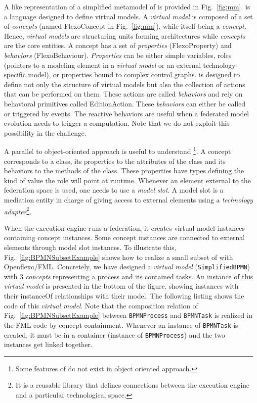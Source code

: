 A \UML like representation of a simplified metamodel of \FML is provided in
Fig.~\ref{fig:mm}. \FML is a language designed to define virtual models. A
\emph{virtual model} is composed of a set of \emph{concepts} (named
\textsf{FlexoConcept} in Fig.~\ref{fig:mm}), while itself being a
\emph{concept}. Hence, \emph{virtual models} are structuring units forming
architectures while \emph{concepts} are the core entities. A concept has a set
of \emph{properties} (\textsf{FlexoProperty}) and \emph{behaviors}
(\textsf{FlexoBehaviour}). \emph{Properties} can be either simple variables,
roles (pointers to a modeling element in a \emph{virtual model} or an external
technology-specific model), or properties bound to complex control graphs. \FML
is designed to define not only the structure of virtual models but also the
collection of actions that can be performed on them. These actions are called
\emph{behaviors} and rely on behavioral primitives called
\textsf{EditionAction}. These \emph{behaviors} can either be called or
triggered by events. The reactive behaviors are useful when a federated model
evolution needs to trigger a computation. Note that we do not exploit this
possibility in the challenge.

A parallel to object-oriented approach is useful to understand
\FML\footnote{Some features of \FML do not exist in object oriented
approach.}\!.  A concept corresponds to a class, its properties to the
attributes of the class and its behaviors to the methods of the class. These
properties have types defining the kind of value the role will point at
runtime. Whenever an element external to the federation space is used, one
needs to use a \emph{model slot}.  A model slot is a mediation entity in charge
of giving access to external elements using a \emph{technology
adapter}\footnote{It is a reusable library that defines connections between the
\FML execution engine and a particular technological space.}.

When the \FML execution engine runs a federation, it creates virtual
model instances containing concept instances. Some concept instances
are connected to external elements through model slot instances.
%
To illustrate this, Fig.~\ref{fig:BPMNSubsetExample} shows how to realize a
small subset of \BPMN with Openflexo/FML. Concretely, we have designed a
\textit{virtual model} (\texttt{SimplifiedBPMN}) with 3 \textit{concepts}
representing a process and its contained tasks. An instance of this
\textit{virtual model} is presented in the bottom of the figure, showing
instances with their \textsf{instanceOf} relationships with their model.
%
The following listing shows the \FML code of this \textit{virtual model}. Note
that the composition relation of Fig.~\ref{fig:BPMNSubsetExample} between
\texttt{BPMNProcess} and \texttt{BPMNTask} is realized in the FML code by
concept containment. Whenever an instance of \texttt{BPMNTask} is created, it
must be in a container (instance of \texttt{BPMNProcess}) and the two instances
get linked together. %

